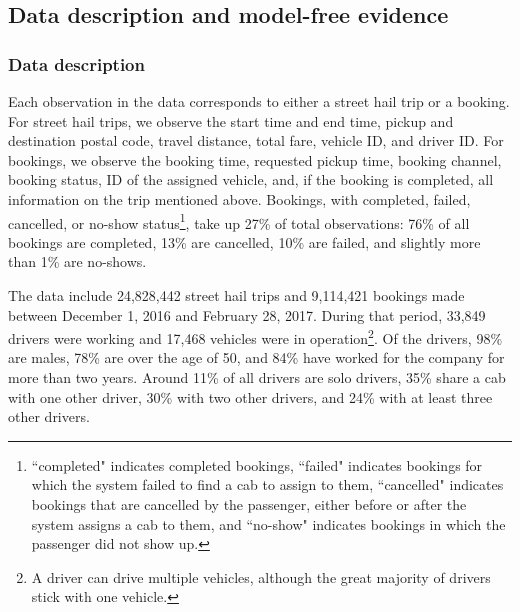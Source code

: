 \documentclass[reviewmode]{AEA}
\begin{document}
\subsection{Data description and model-free evidence}

\subsubsection{Data description}
Each observation in the data corresponds to either a street hail trip or a booking. For street hail trips, we observe the start time and end time, pickup and destination postal code, 
travel distance, total fare, vehicle ID, and driver ID. For bookings, we observe the booking time, requested pickup time, booking channel, booking status,  ID of the assigned vehicle, and, if the booking is completed, all information on the trip mentioned above. Bookings, with completed, failed, cancelled, or no-show status\footnote{``completed" indicates completed bookings, ``failed" indicates bookings for which the system failed to find a cab to assign to them, ``cancelled" indicates bookings that are cancelled by the passenger, either before or after the system assigns a cab to them, and ``no-show" indicates bookings in which the passenger did not show up.}, take up 27\% of  total observations: 76\% of all bookings are completed, 13\% are cancelled, 10\% are failed, and slightly more than 1\% are no-shows.

The data include 24,828,442 street hail trips and 9,114,421 bookings made between December 1, 2016 and February 28, 2017. During that period, 33,849 drivers were working and 17,468 vehicles were in operation\footnote{A 
	driver can drive multiple vehicles, although the great majority of drivers stick with one vehicle.}. Of the drivers, 98\% are males, 78\% are over the age of 50, and 84\% have worked for the company for more than two years. Around 11\% of all drivers are solo drivers, 35\% share a cab with one other driver, 30\% with two other drivers, and 24\% with at least three other drivers.
\end{document}
